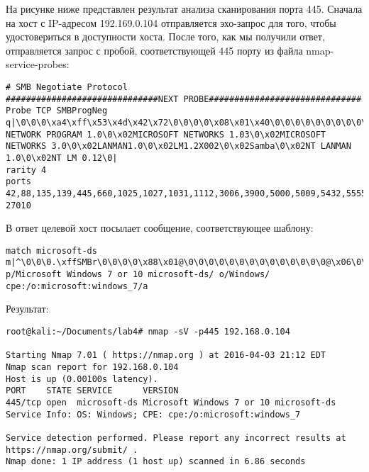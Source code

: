 \documentclass[12pt,a4paper]{report}
\begin{document}
На рисунке ниже представлен результат анализа сканирования порта 445.
Сначала на хост с IP-адресом 192.169.0.104 отправляется эхо-запрос для того, чтобы удостовериться в доступности хоста. После того, как мы получили ответ, отправляется запрос с пробой, соответствующей 445 порту из файла nmap-service-probes:


\begin{verbatim}
# SMB Negotiate Protocol
##############################NEXT PROBE##############################
Probe TCP SMBProgNeg q|\0\0\0\xa4\xff\x53\x4d\x42\x72\0\0\0\0\x08\x01\x40\0\0\0\0\0\0\0\0\0\0\0\0\0\0\x40\x06\0\0\x01\0\0\x81\0\x02PC NETWORK PROGRAM 1.0\0\x02MICROSOFT NETWORKS 1.03\0\x02MICROSOFT NETWORKS 3.0\0\x02LANMAN1.0\0\x02LM1.2X002\0\x02Samba\0\x02NT LANMAN 1.0\0\x02NT LM 0.12\0|
rarity 4
ports 42,88,135,139,445,660,1025,1027,1031,1112,3006,3900,5000,5009,5432,5555,5600,7461,9102,9103,18182,27000-27010
\end{verbatim}


В ответ целевой хост посылает сообщение, соответствующее шаблону: 

\begin{verbatim}
match microsoft-ds m|^\0\0\0.\xffSMBr\0\0\0\0\x88\x01@\0\0\0\0\0\0\0\0\0\0\0\0\0\0@\x06\0\0\x01\0\x11\x07\0.\n\0\x01\0\x04\x11\0\0\0\0\x01\0\0\0\0\0\xfc\xe3\x01\0|s p/Microsoft Windows 7 or 10 microsoft-ds/ o/Windows/ cpe:/o:microsoft:windows_7/a
\end{verbatim}
Результат:
\begin{verbatim}
root@kali:~/Documents/lab4# nmap -sV -p445 192.168.0.104

Starting Nmap 7.01 ( https://nmap.org ) at 2016-04-03 21:12 EDT
Nmap scan report for 192.168.0.104
Host is up (0.00100s latency).
PORT    STATE SERVICE      VERSION
445/tcp open  microsoft-ds Microsoft Windows 7 or 10 microsoft-ds
Service Info: OS: Windows; CPE: cpe:/o:microsoft:windows_7

Service detection performed. Please report any incorrect results at https://nmap.org/submit/ .
Nmap done: 1 IP address (1 host up) scanned in 6.86 seconds
\end{verbatim}
\end{document}

